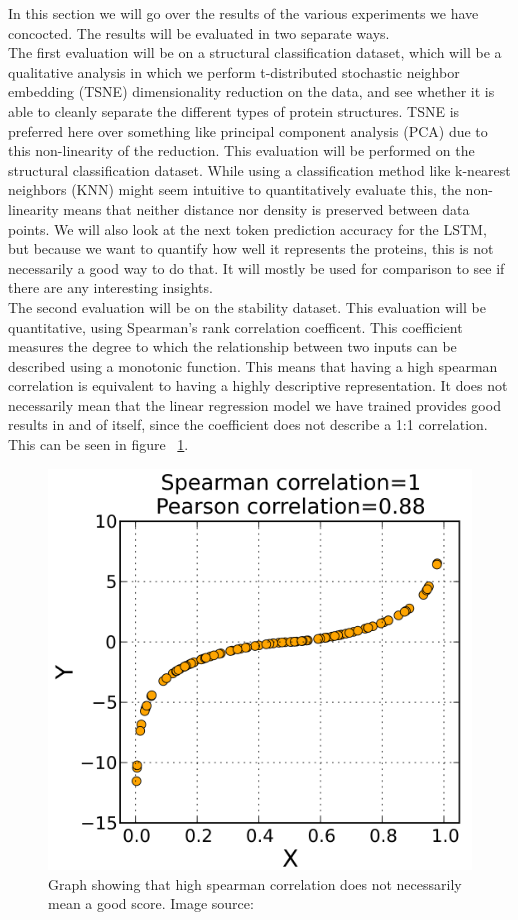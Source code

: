 In this section we will go over the results of the various experiments we have concocted. The results will be evaluated in two separate ways. \\

\noindent 
The first evaluation will be on a structural classification dataset, which will be a qualitative analysis in which we perform t-distributed stochastic neighbor embedding (TSNE) dimensionality reduction on the data, and see whether it is able to cleanly separate the different types of protein structures. TSNE is preferred here over something like principal component analysis (PCA) due to this non-linearity of the reduction. This evaluation will be performed on the structural classification dataset. While using a classification method like k-nearest neighbors (KNN) might seem intuitive to quantitatively evaluate this, the non-linearity means that neither distance nor density is preserved between data points. We will also look at the next token prediction accuracy for the LSTM, but because we want to quantify how well it represents the proteins, this is not necessarily a good way to do that. It will mostly be used for comparison to see if there are any interesting insights.\\

\noindent
The second evaluation will be on the stability dataset. This evaluation will be quantitative, using Spearman's rank correlation coefficent. This coefficient measures the degree to which the relationship between two inputs can be described using a monotonic function. This means that having a high spearman correlation is equivalent to having a highly descriptive representation. It does not necessarily mean that the linear regression model we have trained provides good results in and of itself, since the coefficient does not describe a 1:1 correlation. This can be seen in figure ~\ref{fig:spearman}.

\begin{figure}[!ht]
  \centering
  \includegraphics[width=0.4\linewidth]{latex/imgs/spearman_fig.png}
  \caption{Graph showing that high spearman correlation does not necessarily mean a good score. Image source:\cite{spearman}}\label{fig:spearman}
\end{figure}

